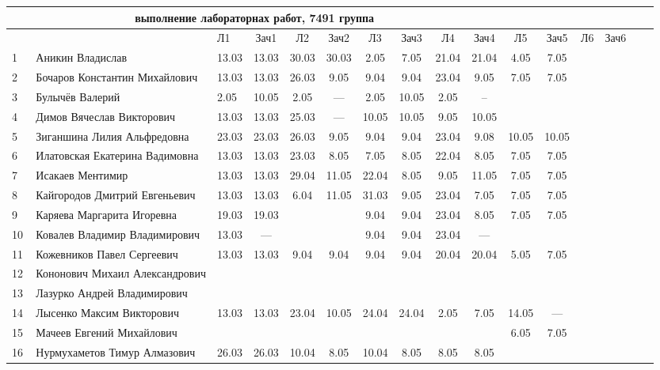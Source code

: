 \documentclass[a4paper,11pt]{article}
\begin{document}
\newpage
{}
\recalctypearea
\hspace{-6.1cm} %
\begin{tabular}{l|llccccccccccccc}
\multicolumn{10}{c}{выполнение лабораторнах работ, 7491 группа} \\
\toprule
&&Л1&Зач1& Л2&Зач2& Л3&Зач3& Л4&Зач4&  Л5&Зач5& Л6&Зач6&\\
\midrule
1\,&Аникин Владислав                &13.03&13.03 &30.03&30.03& 2.05& 7.05&21.04&21.04& 4.05& 7.05 & &\\
2\,&Бочаров Константин Михайлович   &13.03&13.03 &26.03& 9.05& 9.04& 9.04&23.04& 9.05& 7.05& 7.05\\
3\,&Булычёв Валерий                 & 2.05&10.05 & 2.05& --- & 2.05&10.05& 2.05& --  &\\
4\,&Димов Вячеслав Викторович       &13.03&13.03 &25.03& --- &10.05&10.05& 9.05&10.05\\
5\,&Зиганшина Лилия Альфредовна     &23.03&23.03 &26.03& 9.05& 9.04& 9.04&23.04& 9.08&10.05&10.05\\
\midrule
6\,&Илатовская Екатерина Вадимовна  &13.03&13.03 &23.03& 8.05& 7.05& 8.05&22.04& 8.05& 7.05& 7.05\\
7\,&Исакаев Ментимир                &13.03&13.03 &29.04&11.05&22.04& 8.05& 9.05&11.05& 7.05& 7.05\\
8\,&Кайгородов Дмитрий Евгеньевич   &13.03&13.03 & 6.04&11.05&31.03& 9.05&23.04& 7.05& 7.05& 7.05\\
9\,&Каряева Маргарита Игоревна      &19.03&19.03 &     &     & 9.04& 9.04&23.04& 8.05& 7.05& 7.05\\
10\,&Ковалев Владимир Владимирович  &13.03& ---  &     &     & 9.04& 9.04&23.04& --- & &\\
\midrule
11\,&Кожевников Павел Сергеевич     &13.03&13.03 & 9.04& 9.04& 9.04& 9.04&20.04&20.04& 5.05& 7.05\\
12\,&Кононович Михаил Александрович &     &      &     &     &     &     &     &\\
13\,&Лазурко Андрей Владимирович    &     &      &     &     &     &     &     &\\
14\,&Лысенко Максим Викторович      &13.03&13.03 &23.04&10.05&24.04&24.04& 2.05& 7.05&14.05& --- \\
15\,&Мачеев Евгений Михайлович      &     &      &     &     &     &     &     &     & 6.05& 7.05\\
\midrule
16\,&Нурмухаметов Тимур Алмазович   &26.03&26.03 &10.04& 8.05&10.04& 8.05& 8.05& 8.05& &\\

\end{tabular}
\end{document}

